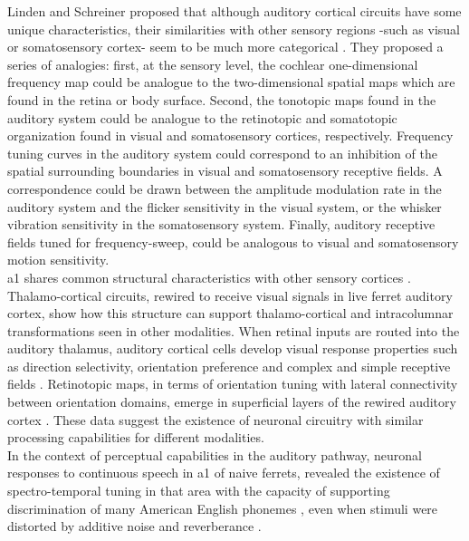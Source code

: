 \documentclass[11pt,a4paper]{article}
\begin{document}
Linden and Schreiner proposed that although auditory
cortical circuits have some unique characteristics,
their similarities with other sensory regions -such as visual or somatosensory cortex-
seem to be much more categorical \cite{linden_2003}.
They proposed a series of analogies:
first, at the sensory level, the cochlear one-dimensional frequency map
could be analogue to the two-dimensional spatial maps which are found
in the retina or body surface.
Second, the tonotopic maps found in the auditory system could be analogue to the
retinotopic and somatotopic organization found in visual and somatosensory cortices,
respectively.
Frequency tuning curves in the auditory system could correspond to an inhibition of
the spatial surrounding boundaries in visual and somatosensory receptive fields.
A correspondence could be drawn between the amplitude modulation rate
in the auditory system and the flicker sensitivity in the visual system, or
the whisker vibration sensitivity in the somatosensory system.
Finally, auditory receptive fields tuned for frequency-sweep, could be
analogous to visual and somatosensory motion sensitivity.\\

\gls{a1} shares common structural
characteristics with other sensory cortices
\cite{huang_2000, winer_1992, rockel_1980, mitani_1985, mitani_1985A}.
Thalamo-cortical circuits, rewired to receive
visual signals in live ferret auditory cortex,
show how this structure can support
thalamo-cortical and intracolumnar transformations
seen in other modalities.
When retinal inputs are routed into the auditory thalamus,
auditory cortical cells develop visual response properties
such as direction selectivity,
orientation preference and
complex and simple receptive fields
\cite{sur_1988, angelucci_1998, roe_1992}.
Retinotopic maps, in terms of orientation tuning with lateral connectivity between
orientation domains, emerge in superficial layers of the rewired
auditory cortex \cite{roe_1990, sur_2000}.
These data suggest the existence of neuronal circuitry
with similar processing capabilities for different modalities.\\

In the context of perceptual capabilities in 
the auditory pathway,
neuronal responses to continuous speech in
\gls{a1} of naive ferrets,
revealed the existence of spectro-temporal tuning
in that area with the capacity of supporting discrimination
of many American English phonemes \cite{mesgarani_2008},
even when stimuli were distorted by additive noise and
reverberance \cite{mesgarani_2014A}.\\
\end{document}
